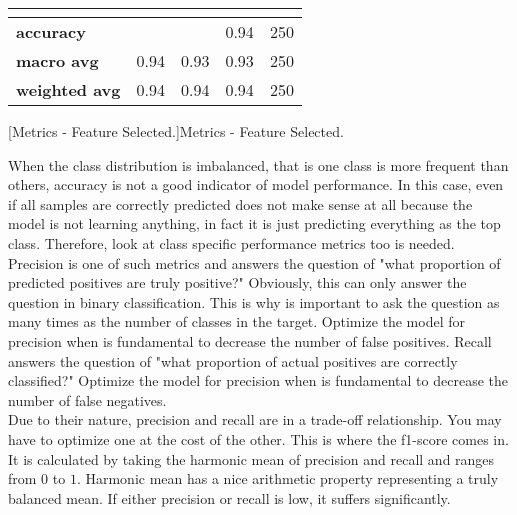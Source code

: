 \begin{table}[htb]
\begin{tabular}{|lllll|}
        \multicolumn{5}{|l|}{}                                                                                                                                                                   \\ \hline
        \multicolumn{1}{|l|}{\textbf{accuracy}}     & \multicolumn{2}{l|}{}                                                          & \multicolumn{1}{l|}{0.94}              & 250              \\ \hline
        \multicolumn{1}{|l|}{\textbf{macro avg}}    & \multicolumn{1}{l|}{0.94}               & \multicolumn{1}{l|}{0.93}            & \multicolumn{1}{l|}{0.93}              & 250              \\ \hline
        \multicolumn{1}{|l|}{\textbf{weighted avg}} & \multicolumn{1}{l|}{0.94}               & \multicolumn{1}{l|}{0.94}            & \multicolumn{1}{l|}{0.94}              & 250              \\ \hline
    \end{tabular}
	[Metrics - Feature Selected.]{Metrics - Feature Selected.}
    \label{tab:featuresel}
\end{table}

\noindent When the class distribution is imbalanced, that is one class is more frequent than others, accuracy is not a good indicator of model performance. In this case, even if all samples are correctly predicted does not make sense at all because the model is not learning anything, in fact it is just predicting everything as the top class. Therefore, look at class specific performance metrics too is needed. Precision is one of such metrics and answers the question of "what proportion of predicted positives are truly positive?" Obviously, this can only answer the question in binary classification. This is why is important to ask the question as many times as the number of classes in the target. Optimize the model for precision when is fundamental to decrease the number of false positives. Recall answers the question of "what proportion of actual positives are correctly classified?" Optimize the model for precision when is fundamental to decrease the number of false negatives. \\

\noindent Due to their nature, precision and recall are in a trade-off relationship. You may have to optimize one at the cost of the other. This is where the f1-score comes in. It is calculated by taking the harmonic mean of precision and recall and ranges from $0$ to $1$. Harmonic mean has a nice arithmetic property representing a truly balanced mean. If either precision or recall is low, it suffers significantly. \\

